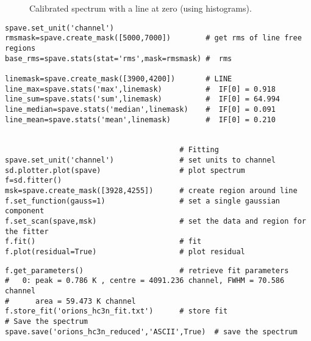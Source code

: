 \begin{figure}[h!]
\caption{\label{fig:spave} Calibrated spectrum with a line at zero (using histograms).}
\hrulefill
\end{figure}
 
\small
\begin{verbatim}
spave.set_unit('channel')                                                               
rmsmask=spave.create_mask([5000,7000])        # get rms of line free regions                  
base_rms=spave.stats(stat='rms',mask=rmsmask) #  rms
                                        
linemask=spave.create_mask([3900,4200])       # LINE
line_max=spave.stats('max',linemask)          #  IF[0] = 0.918
line_sum=spave.stats('sum',linemask)          #  IF[0] = 64.994
line_median=spave.stats('median',linemask)    #  IF[0] = 0.091
line_mean=spave.stats('mean',linemask)        #  IF[0] = 0.210
                                                                                        
                                                                                        
                                        # Fitting
spave.set_unit('channel')               # set units to channel                          
sd.plotter.plot(spave)                  # plot spectrum
f=sd.fitter()
msk=spave.create_mask([3928,4255])      # create region around line                     
f.set_function(gauss=1)                 # set a single gaussian component               
f.set_scan(spave,msk)                   # set the data and region for the fitter        
f.fit()                                 # fit                                           
f.plot(residual=True)                   # plot residual
\end{verbatim}
\normalsize


\small
\begin{verbatim}
f.get_parameters()                      # retrieve fit parameters
#   0: peak = 0.786 K , centre = 4091.236 channel, FWHM = 70.586 channel
#      area = 59.473 K channel
f.store_fit('orions_hc3n_fit.txt')      # store fit                                     
# Save the spectrum
spave.save('orions_hc3n_reduced','ASCII',True)  # save the spectrum                     
\end{verbatim}
\normalsize

